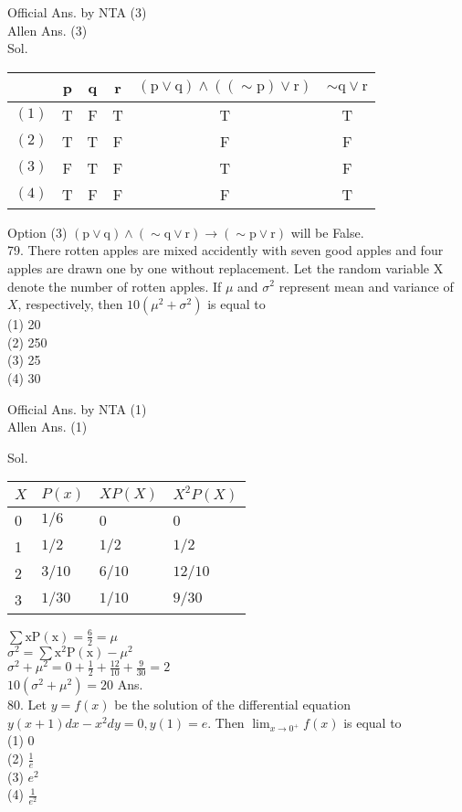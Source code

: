 \documentclass[10pt]{article}
\begin{document}
Official Ans. by NTA (3)\\
Allen Ans. (3)\\
Sol.

\begin{center}
\begin{tabular}{|c|c|c|c|c|c|}
\hline
 & p & q & r & \((\mathrm{p} \vee \mathrm{q}) \wedge((\sim \mathrm{p}) \vee \mathrm{r})\) & \(\sim \mathrm{q} \vee \mathrm{r}\) \\
\hline
\((1)\) & T & F & T & T & T \\
\hline
\((2)\) & T & T & F & F & F \\
\hline
\((3)\) & F & T & F & T & F \\
\hline
\((4)\) & T & F & F & F & T \\
\hline
\end{tabular}
\end{center}

Option (3) \((\mathrm{p} \vee \mathrm{q}) \wedge(\sim \mathrm{q} \vee \mathrm{r}) \rightarrow(\sim \mathrm{p} \vee \mathrm{r})\) will be False.\\
79. There rotten apples are mixed accidently with seven good apples and four apples are drawn one by one without replacement. Let the random variable X denote the number of rotten apples. If \(\mu\) and \(\sigma^{2}\) represent mean and variance of \(X\), respectively, then \(10\left(\mu^{2}+\sigma^{2}\right)\) is equal to\\
(1) 20\\
(2) 250\\
(3) 25\\
(4) 30

Official Ans. by NTA (1)\\
Allen Ans. (1)

Sol.

\begin{center}
\begin{tabular}{|l|l|l|l|}
\hline
\(X\) & \(P(x)\) & \(X P(X)\) & \(X^{2} P(X)\) \\
\hline
0 & \(1 / 6\) & 0 & 0 \\
\hline
1 & \(1 / 2\) & \(1 / 2\) & \(1 / 2\) \\
\hline
2 & \(3 / 10\) & \(6 / 10\) & \(12 / 10\) \\
\hline
3 & \(1 / 30\) & \(1 / 10\) & \(9 / 30\) \\
\hline
\end{tabular}
\end{center}

\(\sum \mathrm{xP}(\mathrm{x})=\frac{6}{2}=\mu\)\\
\(\sigma^{2}=\sum \mathrm{x}^{2} \mathrm{P}(\mathrm{x})-\mu^{2}\)\\
\(\sigma^{2}+\mu^{2}=0+\frac{1}{2}+\frac{12}{10}+\frac{9}{30}=2\)\\
\(10\left(\sigma^{2}+\mu^{2}\right)=20\) Ans.\\
80. Let \(y=f(x)\) be the solution of the differential equation \(y(x+1) d x-x^{2} d y=0, y(1)=e\). Then \(\lim _{x \rightarrow 0^{+}} f(x)\) is equal to\\
(1) 0\\
(2) \(\frac{1}{e}\)\\
(3) \(e^{2}\)\\
(4) \(\frac{1}{e^{2}}\)
\end{document}

